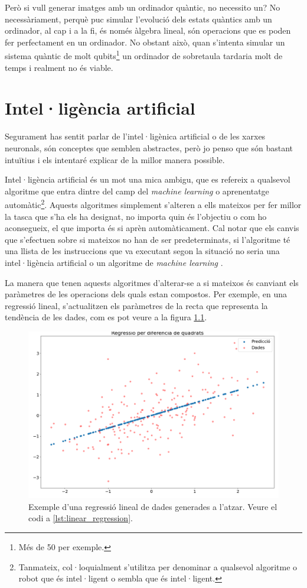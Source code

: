 Però si vull generar imatges amb un ordinador quàntic, no necessito un? No necessàriament, perquè puc simular l'evolució dels estats quàntics amb un ordinador, al cap i a la fi, és només àlgebra lineal, són operacions que es poden fer perfectament en un ordinador. No obstant això, quan s'intenta simular un sistema quàntic de molt qubits\footnote{Més de 50 per exemple.} un ordinador de sobretaula tardaria molt de temps i realment no és viable.


\chapter{Intel·ligència artificial}

Segurament has sentit parlar de l'intel·ligènica artificial o de les xarxes neuronals, són conceptes que semblen abstractes, però jo penso que són bastant intuïtius i els intentaré explicar de la millor manera possible.

Intel·ligència artificial és un mot una mica ambigu, que es refereix a qualsevol algoritme que entra dintre del camp del \textit{machine learning} o aprenentatge automàtic\footnote{Tanmateix, col·loquialment s'utilitza per denominar a qualsevol algoritme o robot que és intel·ligent o sembla que és intel·ligent. }. Aquests algoritmes simplement s'alteren a ells mateixos per fer millor la tasca que s'ha els ha designat, no importa quin és l'objectiu o com ho aconsegueix, el que importa és si aprèn automàticament. Cal notar que els canvis que s'efectuen sobre si mateixos no han de ser predeterminats, si l'algoritme té una llista de les instruccions que va executant segon la situació no seria una intel·ligència artificial o un algoritme de \textit{machine learning} \cite{deeplearning}.

La manera que tenen aquests algoritmes d'alterar-se a si mateixos és canviant els paràmetres de les operacions dels quals estan compostos. Per exemple, en una regressió lineal, s'actualitzen els paràmetres de la recta que representa la tendència de les dades, com es pot veure a la figura \ref{fig:leastsquares}.

\begin{figure}
	\centering
	\includegraphics[width=0.7\linewidth]{Figures/least_squares}
	\caption{Exemple d'una regressió lineal de dades generades a l'atzar. Veure el codi a \ref{lst:linear_regression}.}
	\label{fig:leastsquares}
\end{figure}

